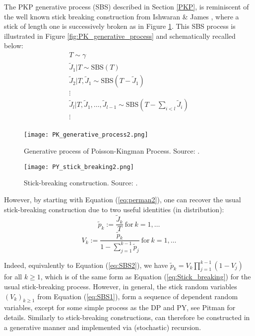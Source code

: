 The \gls{PKP} generative process (\acrlong{SBS}) described in Section \ref{PKP}, is reminiscent of the well known stick breaking construction from Ishwaran \& James \cite{Ishwaran:2001dw}, where a stick of length one is successively broken as in Figure \ref{fig:PY_stick_breaking}.
This \gls{SBS} process is illustrated in Figure \ref{fig:PK_generative_process} and schematically recalled below:
\begin{gather*}
T \sim \gamma \\
\tilde{J}_1|T \sim \text{SBS}(T) \\
\tilde{J}_2|T,\tilde{J}_1 \sim \text{SBS}(T - \tilde{J}_1) \\
\vdots \\
\tilde{J}_{l}|T,\tilde{J}_1,\dots,\tilde{J}_{l-1} \sim \text{SBS}(T - \sum_{i<l} \tilde{J}_i) \\
\vdots \\
\end{gather*}
\begin{figure}[h!]
  \centering
  \begin{minipage}[b]{0.48\textwidth}
    \texttt{[image: PK\_generative\_process2.png]}
    \caption{Generative process of Poisson-Kingman Process. Source: \cite{LomeliThesis}.}
    \label{fig:PK_generative_process}
  \end{minipage}
  \hfill
  \begin{minipage}[b]{0.48\textwidth}
    \texttt{[image: PY\_stick\_breaking2.png]}
    \caption{Stick-breaking construction. Source: \cite{LomeliThesis}.}
    \label{fig:PY_stick_breaking}
  \end{minipage}
\end{figure}
However, by starting with Equation (\ref{eq:perman2}), one can recover the usual stick-breaking construction due to two useful identities (in distribution):
\begin{equation} \label{eq:SBS1}
\tilde{p}_k := \frac{\tilde{J}_k}{T} \ \text{for} \ k=1,\dots
\end{equation}
\begin{equation} \label{eq:SBS2}
V_k := \frac{\tilde{p}_k}{1 - \sum_{j=1}^{k-1}{\tilde{p}_j}} \ \text{for} \ k=1,\dots
\end{equation}

Indeed, equivalently to Equation (\ref{eq:SBS2}), we have $\tilde{p}_k = V_k \prod_{j=1}^{k-1}{(1-V_j)}$ for all $k \ge 1$, which is of the same form as Equation (\ref{eq:Stick_breaking}) for the usual stick-breaking process.
However, in general, the stick random variables $(V_k)_{k \ge 1}$ from Equation (\ref{eq:SBS1}), form a sequence of dependent random variables, except for some simple process as the \gls{DP} and \gls{PY}, see Pitman \cite{PitmanRDD} for details.
Similarly to stick-breaking constructions,  can therefore be constructed in a generative manner and implemented via (stochastic) recursion.

